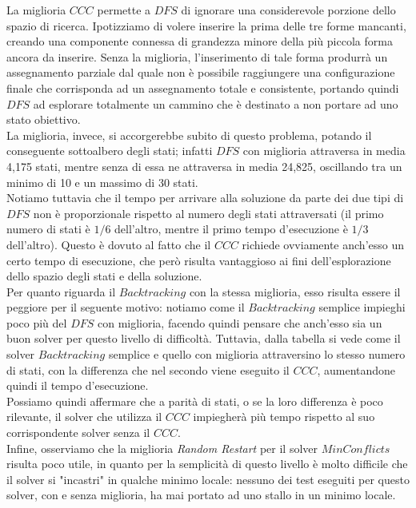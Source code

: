 La miglioria $CCC$ permette a $DFS$ di ignorare una considerevole porzione dello spazio di ricerca. Ipotizziamo di volere inserire la prima delle tre forme mancanti, creando una componente connessa di grandezza minore della più piccola forma ancora da inserire. Senza la miglioria, l'inserimento di tale forma produrrà un assegnamento parziale dal quale non è possibile raggiungere una configurazione finale che corrisponda ad un assegnamento totale e consistente, portando quindi $DFS$ ad esplorare totalmente un cammino che è destinato a non portare ad uno stato obiettivo.\\
La miglioria, invece, si accorgerebbe subito di questo problema, potando il conseguente sottoalbero degli stati; infatti $DFS$ con miglioria attraversa in media 4,175 stati, mentre senza di essa ne attraversa in media 24,825, oscillando tra un minimo di 10 e un massimo di 30 stati.\\
Notiamo tuttavia che il tempo per arrivare alla soluzione da parte dei due tipi di $DFS$ non è proporzionale rispetto al numero degli stati attraversati (il primo numero di stati è $1/6$ dell'altro, mentre il primo tempo d'esecuzione è $1/3$ dell'altro). Questo è dovuto al fatto che il $CCC$ richiede ovviamente anch'esso un certo tempo di esecuzione, che però risulta vantaggioso ai fini dell'esplorazione dello spazio degli stati e della soluzione.\\

Per quanto riguarda il $Backtracking$ con la stessa miglioria, esso risulta essere il peggiore per il seguente motivo: notiamo come il $Backtracking$ semplice impieghi poco più del $DFS$ con miglioria, facendo quindi pensare che anch'esso sia un buon solver per questo livello di difficoltà. Tuttavia, dalla tabella si vede come il solver $Backtracking$ semplice e quello con miglioria attraversino lo stesso numero di stati, con la differenza che nel secondo viene eseguito il $CCC$, aumentandone quindi il tempo d'esecuzione.\\
Possiamo quindi affermare che a parità di stati, o se la loro differenza è poco rilevante, il solver che utilizza il $CCC$ impiegherà più tempo rispetto al suo corrispondente solver senza il $CCC$.\\

Infine, osserviamo che la miglioria \textit{Random Restart} per il solver $MinConflicts$ risulta poco utile, in quanto per la semplicità di questo livello è molto difficile che il solver si "incastri" in qualche minimo locale: nessuno dei test eseguiti per questo solver, con e senza miglioria, ha mai portato ad uno stallo in un minimo locale.
